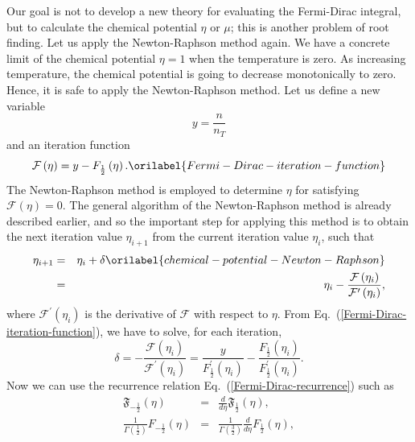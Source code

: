 \documentclass[aps,showkeys,noshowpacs,superscriptaddress,pre,preprint]{revtex4-2}
\let\label\orilabel
\begin{document}
Our goal is not to develop a new theory for evaluating the Fermi-Dirac integral, 
but to calculate the chemical potential $\eta$ or $\mu$;
this is another problem of root finding.
Let us apply the Newton-Raphson method again.
We have a concrete limit of the chemical potential $\eta = 1$
when the temperature is zero.
As increasing temperature, the chemical potential is going to decrease monotonically to zero.
Hence, it is safe to apply the Newton-Raphson method.
Let us define a new variable 
\begin{equation*}
y = \frac{n}{n_T} 
\end{equation*} 
and an iteration function 
\begin{equation}
{\mathcal{F} \left( \eta \right)} = y - F_{\frac{1}{2}} \left( \eta \right) .
\label{Fermi-Dirac-iteration-function}
\end{equation}
The Newton-Raphson method is employed to determine $\eta$ for satisfying ${\mathcal{F} \left( \eta \right)} = 0$.
The general algorithm of the Newton-Raphson method is already described earlier,
and so the important step for applying this method is to obtain the next iteration value $\eta_{i+1}$
from the current iteration value $\eta_i$, such that
\begin{eqnarray}
\eta_{i+1} &=& \eta_i + \delta \label{chemical-potential-Newton-Raphson} \\
&=& \eta_i - \frac{\mathcal{F} \left( \eta_i \right)}{\mathcal{F}^\prime \left( \eta_i \right)}, \nonumber
\end{eqnarray}
where ${\mathcal{F}^\prime \left( \eta_i \right)}$ is the derivative of $\mathcal{F}$ with respect to $\eta$.
From Eq.~(\ref{Fermi-Dirac-iteration-function}), we have to solve, for each iteration,
\begin{equation*}
\delta = - \frac{\mathcal{F} \left( \eta_i \right)}{\mathcal{F}^\prime \left( \eta_i \right)}
= \frac{y}{F_{\frac{1}{2}}^\prime \left( \eta_i \right)} - 
\frac{F_{\frac{1}{2}} \left( \eta_i \right)}{F_{\frac{1}{2}}^\prime \left( \eta_i \right)} .
\end{equation*}
Now we can use the recurrence relation Eq.~(\ref{Fermi-Dirac-recurrence}) such as
\begin{eqnarray*}
\mathfrak{F}_{-\frac{1}{2}} \left( \eta \right) 
&=& \frac{d}{d\eta} \mathfrak{F}_{\frac{1}{2}} \left( \eta \right) , \\
\frac{1}{\Gamma \left( \frac{1}{2} \right)} F_{-\frac{1}{2}} \left( \eta \right) 
&=& \frac{1}{\Gamma \left( \frac{3}{2} \right) } \frac{d}{d\eta} F_{\frac{1}{2}} \left( \eta \right) ,
\end{eqnarray*}
\end{document}
